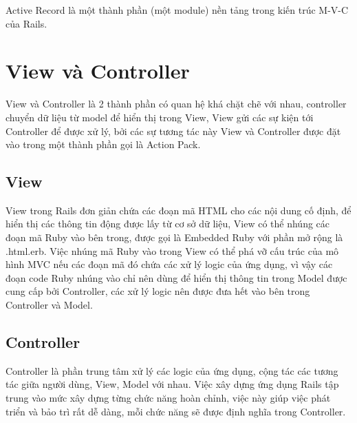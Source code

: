 Active Record là một thành phần (một module) nền tảng trong kiến trúc M-V-C của Rails.

\section{View và Controller}
View và Controller là 2 thành phần có quan hệ khá chặt chẽ với nhau, controller chuyển dữ liệu từ model để hiển thị trong View, View gửi các sự kiện tới Controller để được xử lý, bởi các sự tương tác này View và Controller được đặt vào trong một thành phần gọi là Action Pack.

\subsection{View}
View trong Rails đơn giản chứa các đoạn mã HTML cho các nội dung cố định, để hiển thị các thông tin động được lấy từ cơ sở dữ liệu, View có thể nhúng các đoạn mã Ruby vào bên trong, được gọi là Embedded Ruby với phần mở rộng là .html.erb. Việc nhúng mã Ruby vào trong View có thể phá vỡ cấu trúc của mô hình MVC nếu các đoạn mã đó chứa các xử lý logic của ứng dụng, vì vậy các đoạn code Ruby nhúng vào chỉ nên dùng để hiển thị thông tin trong Model được cung cấp bởi Controller, các xử lý logic nên được đưa hết vào bên trong Controller và Model. 
 
\subsection{Controller}
Controller là phần trung tâm xử lý các logic của ứng dụng, cộng tác các tương tác giữa người dùng, View, Model với nhau. Việc xây dựng ứng dụng Rails tập trung vào mức xây dựng từng chức năng hoàn chỉnh, việc này giúp việc phát triển và bảo trì rất dễ dàng, mỗi chức năng sẽ được định nghĩa trong Controller.

